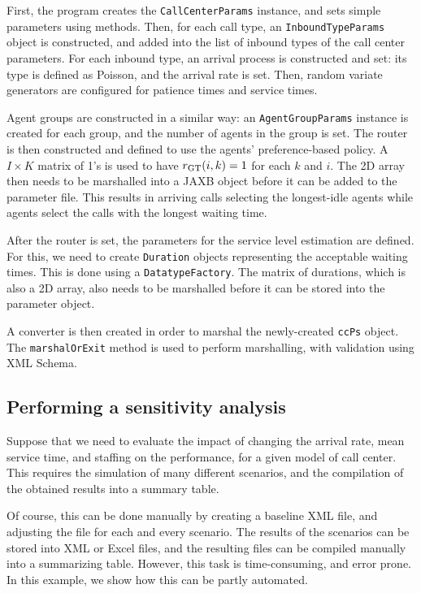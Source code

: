 First, the program creates the \texttt{Call\-Center\-Params} instance,
and sets simple parameters using methods.
Then, for each call type, an \texttt{Inbound\-Type\-Params} object is
constructed, and
added into the list of inbound types of the call center parameters.
For each inbound type, an arrival process is constructed and set:
its type is defined as Poisson, and the arrival rate is set.
Then, random variate generators are configured for patience times and
service times.

Agent groups are constructed in a similar way:
an \texttt{Agent\-Group\-Params} instance is created for each group,
and the number of agents in the group is set.
The router is then constructed and defined to use the
agents' preference-based policy.
A $I\times K$ matrix of 1's is used to have $\rGT(i, k)=1$ for each
$k$ and $i$.
The 2D array then needs to be marshalled into a JAXB object before it
can be added to the parameter file.
This results in arriving calls selecting the longest-idle agents while
agents select the calls with the longest waiting time.

After the router is set, the parameters for the service level
estimation are defined.
For this, we need to create \texttt{Duration} objects representing
the acceptable waiting times.  This is done using a
\texttt{DatatypeFactory}.
The matrix of durations, which is also a 2D array, also needs to be
marshalled before it can be stored into the parameter object.

A converter is then created in order to marshal the newly-created
\texttt{ccPs} object.
The \texttt{marshal\-Or\-Exit} method is used to perform marshalling,
with validation using XML Schema.

\subsection{Performing a sensitivity analysis}

Suppose that we need to evaluate the impact of changing the
arrival rate, mean service time, and staffing on the performance,
for a given model of call center.
This requires the simulation of many different scenarios, and the
compilation of the obtained results into a summary table.

Of course, this can be done manually by creating a baseline XML file,
and adjusting the file for each and every scenario. The results of the
scenarios can be stored into XML or Excel files, and the resulting files can be
compiled manually into a summarizing table.
However, this task is time-consuming, and error prone.
In this example, we show how this can be partly automated.

